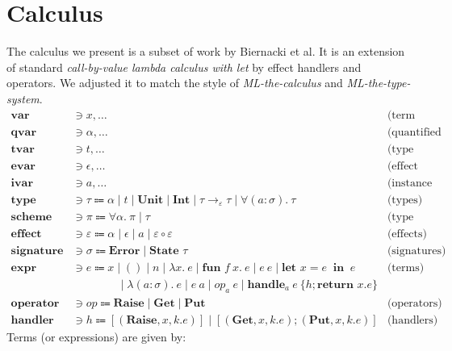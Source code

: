 \documentclass[declaration,shortabstract]{iithesis}
\theoremstyle{definition} \newtheorem{definition}{Definition}[section]
\newcommand{\arrow}[3]{{#1}\rightarrow_{#2}{#3}}
\newcommand{\lam}[1][x]{\ensuremath{\lambda #1.\:}}
\begin{document}
\chapter{Calculus}
The calculus we present is a subset of work by Biernacki et al\cite{binders-labels}.
It is an extension of standard \textit{call-by-value lambda calculus with let} by effect handlers and operators. 
We adjusted it to match the style of \textit{ML-the-calculus} and \textit{ML-the-type-system}\cite{emlti}. 
\begin{align*} 
\textbf{var} & \ni x , \dots & \text{(term variables)}
\\ 
\textbf{qvar} & \ni \alpha , \dots & \text{(quantified variables)}
\\ 
\textbf{tvar} & \ni t , \dots & \text{(type variables)}
\\ 
\textbf{evar} & \ni \epsilon , \dots & \text{(effect variables)}
\\ 
\textbf{ivar} & \ni a , \dots & \text{(instance variables)}
\\ 
\textbf{type} & \ni \tau \Coloneqq
\alpha \mid t \mid \textbf{Unit} \mid \textbf{Int} \mid \arrow{\tau}{\varepsilon}{\tau}
\mid \forall (a : \sigma) .\: \tau
 & \text{(types)}
\\
\textbf{scheme} & \ni \pi \Coloneqq \forall \alpha.\:\pi \mid \tau &\text{(type schemes)}
\\ 
\textbf{effect} & \ni \varepsilon \Coloneqq 
\alpha \mid \epsilon \mid a \mid \varepsilon \circ \varepsilon 
 & \text{(effects)}
\\ 
\textbf{signature} & \ni \sigma \Coloneqq \textbf{Error} \mid \textbf{State } \tau& \text{(signatures)}
\\
\textbf{expr} & \ni e \Coloneqq x \mid () \mid n \mid \lam e \mid \textbf{fun }f\:x.\:e \mid e \: e \mid \textbf{let } x = e \: \textbf{ in } \: e & \text{(terms)}
\\
 & \qquad\qquad \mid \lam[(a : \sigma)] e \mid e \: a \mid op_a \: e \mid \textbf{handle}_a \: e\: \{h; \textbf{return } x. e\}
\\
\textbf{operator} & \ni op \Coloneqq \textbf{Raise} \mid \textbf{Get} \mid \textbf{Put} & \text{(operators)} 
\\ 
\textbf{handler} & \ni h \Coloneqq [(\textbf{Raise}, x, k. e)] \mid [(\textbf{Get}, x, k. e); (\textbf{Put}, x, k. e)]& \text{(handlers)}
\end{align*}
Terms (or expressions) are given by:
\end{document}

